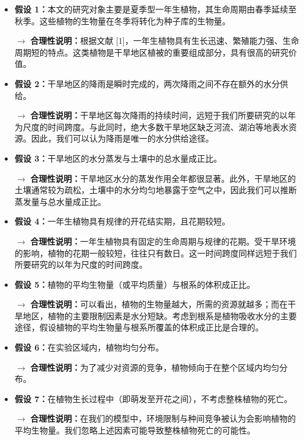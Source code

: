 \documentclass[11pt,a4paper]{ctexart}
\begin{document}
\begin{itemize}
\item \textbf{假设 1：}本文的研究对象主要是夏季型一年生植物，其生命周期由春季延续至秋季。这些植物的生物量在冬季将转化为种子库的生物量。

$\rightarrow$ \textbf{合理性说明：}根据文献 [1]，一年生植物具有生长迅速、繁殖能力强、生命周期短的特点。这类植物是干旱地区植被的重要组成部分，具有很高的研究价值。

\item \textbf{假设 2：}干旱地区的降雨是瞬时完成的，两次降雨之间不存在额外的水分供给。

$\rightarrow$ \textbf{合理性说明：}干旱地区每次降雨的持续时间，远短于我们所要研究的以年为尺度的时间跨度。与此同时，绝大多数干旱地区缺乏河流、湖泊等地表水资源。因此，我们可以认为降雨是唯一的水分供给途径。

\item \textbf{假设 3：}干旱地区的水分蒸发与土壤中的总水量成正比。

$\rightarrow$ \textbf{合理性说明：}干旱地区水分的蒸发作用全年都很显著。此外，干旱地区的土壤通常较为疏松，土壤中的水分均匀地暴露于空气之中，因此我们可以推断蒸发量与总水量成正比。

\item \textbf{假设 4：}一年生植物具有规律的开花结实期，且花期较短。

$\rightarrow$ \textbf{合理性说明：}一年生植物具有固定的生命周期与规律的花期。受干旱环境的影响，植物的花期一般较短，往往只有数日。这一时间跨度同样远短于我们所要研究的以年为尺度的时间跨度。

\item \textbf{假设 5：}植物的平均生物量（或平均质量）与根系的体积成正比。

$\rightarrow$ \textbf{合理性说明：}可以看出，植物的生物量越大，所需的资源就越多；而在干旱地区，植物的主要限制因素是水分短缺。考虑到根系是植物吸收水分的主要途径，假设植物的平均生物量与根系所覆盖的体积成正比是合理的。

\item \textbf{假设 6：}在实验区域内，植物均匀分布。

$\rightarrow$ \textbf{合理性说明：}为了减少对资源的竞争，植物倾向于在整个区域内均匀分布。

\item \textbf{假设 7：}在植物生长过程中（即萌发至开花之间），不考虑整株植物的死亡。

$\rightarrow$ \textbf{合理性说明：}在我们的模型中，环境限制与种间竞争被认为会影响植物的平均生物量。我们忽略上述因素可能导致整株植物死亡的可能性。
\end{itemize}
\end{document}
